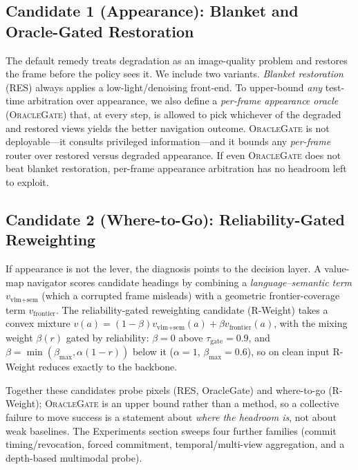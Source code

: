 \subsection{Candidate 1 (Appearance): Blanket and Oracle-Gated Restoration}

The default remedy treats degradation as an image-quality problem and restores
the frame before the policy sees it. We include two variants. \emph{Blanket
restoration} (RES) always applies a low-light/denoising front-end. To upper-bound
\emph{any} test-time arbitration over appearance, we also define a \emph{per-frame
appearance oracle} (\textsc{OracleGate}) that, at every step, is allowed to pick
whichever of the degraded and restored views yields the better navigation
outcome. \textsc{OracleGate} is not deployable---it consults privileged
information---and it bounds any \emph{per-frame} router over restored
versus degraded appearance. If even \textsc{OracleGate} does not beat
blanket restoration, per-frame appearance arbitration has no headroom left
to exploit.

\subsection{Candidate 2 (Where-to-Go): Reliability-Gated Reweighting}

If appearance is not the lever, the diagnosis points to the decision layer.
A value-map navigator scores candidate headings by combining a
\emph{language--semantic term} $v_{\text{vlm+sem}}$ (which a corrupted frame
misleads) with a geometric frontier-coverage term $v_{\text{frontier}}$.
The reliability-gated reweighting candidate (R-Weight) takes a convex mixture
$v(a)=(1{-}\beta)v_{\text{vlm+sem}}(a)+\beta v_{\text{frontier}}(a)$, with
the mixing weight $\beta(r)$ gated by reliability: $\beta{=}0$ above
$\tau_{\text{gate}}{=}0.9$, and $\beta{=}\min(\beta_{\max},\alpha(1{-}r))$
below it ($\alpha{=}1$, $\beta_{\max}{=}0.6$), so on clean input R-Weight
reduces exactly to the backbone.

Together these candidates probe pixels (RES, OracleGate) and where-to-go
(R-Weight); \textsc{OracleGate} is an upper bound rather than a method, so
a collective failure to move success is a statement about \emph{where the
headroom is}, not about weak baselines. The Experiments section sweeps
four further families (commit timing/revocation, forced commitment,
temporal/multi-view aggregation, and a depth-based multimodal probe).
